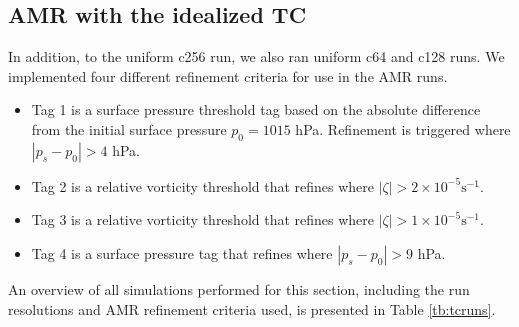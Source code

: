 \subsection{AMR with the idealized TC}
In addition, to the uniform c256 run, we also ran uniform c64 and c128 runs.
We implemented four different refinement criteria for use in the AMR runs.
\begin{itemize}
    \item
        Tag 1 is a surface pressure threshold tag based on the
        absolute difference from the initial surface pressure $p_0=1015$ hPa. Refinement 
        is triggered where $|p_s - p_0| > 4$ hPa.
    \item
        Tag 2 is a relative vorticity threshold that refines where
        $|\zeta| >  2 \times 10^{-5} \mathrm{s}^{-1}$.
     \item
        Tag 3 is a relative vorticity threshold that refines where
        $|\zeta| > 1 \times 10^{-5} \mathrm{s}^{-1}$.
     \item
        Tag 4 is a surface pressure tag that refines where
        $|p_s - p_0| > 9$ hPa.
\end{itemize}
An overview of all simulations performed for this section, including the run resolutions and 
AMR refinement criteria used, is presented in Table \ref{tb:tcruns}.

